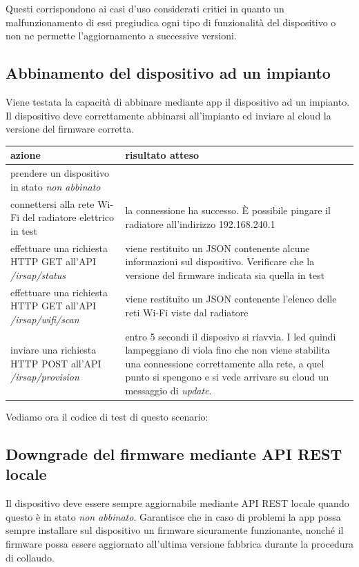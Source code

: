 \documentclass[12pt,a4paper,twoside,titlepage]{book}
\begin{document}
Questi corrispondono ai casi d'uso considerati critici in quanto un malfunzionamento
di essi pregiudica ogni tipo di funzionalità del dispositivo o non ne permette l'aggiornamento
a successive versioni.

\subsection{Abbinamento del dispositivo ad un impianto}

Viene testata la capacità di abbinare mediante app il dispositivo ad un impianto.
Il dispositivo deve correttamente abbinarsi all’impianto ed inviare al cloud la versione
del firmware corretta.

\begin{center}
\begin{tabular}{| p{5cm} | p{7cm} |}
    \hline \textbf{azione} & \textbf{risultato atteso} \\
    \hline prendere un dispositivo in stato \textit{non abbinato} & \\
    \hline connettersi alla rete Wi-Fi del radiatore elettrico in test & la connessione ha successo. È possibile pingare il radiatore all'indirizzo 192.168.240.1 \\
    \hline effettuare una richiesta HTTP GET all'API \textit{/irsap/status} & viene restituito un JSON contenente alcune informazioni sul dispositivo. Verificare che la versione del firmware indicata sia quella in test \\
    \hline effettuare una richiesta HTTP GET all'API \textit{/irsap/wifi/scan} & viene restituito un JSON contenente l'elenco delle reti Wi-Fi viste dal radiatore \\
    \hline inviare una richiesta HTTP POST all'API \textit{/irsap/provision} & entro 5 secondi il disposivo si riavvia. I led quindi lampeggiano di viola fino che non viene stabilita una connessione correttamente alla rete, a quel punto si spengono e si vede arrivare su cloud un messaggio di \textit{update}. \\
    \hline
\end{tabular}
\end{center}

Vediamo ora il codice di test di questo scenario:



\subsection{Downgrade del firmware mediante API REST locale}
Il dispositivo deve essere sempre aggiornabile mediante API REST locale quando questo
è in stato \textit{non abbinato}. Garantisce che in caso di problemi la app possa sempre
installare sul dispositivo un firmware sicuramente funzionante, nonché il firmware
possa essere aggiornato all’ultima versione fabbrica durante la procedura di collaudo.
\end{document}
